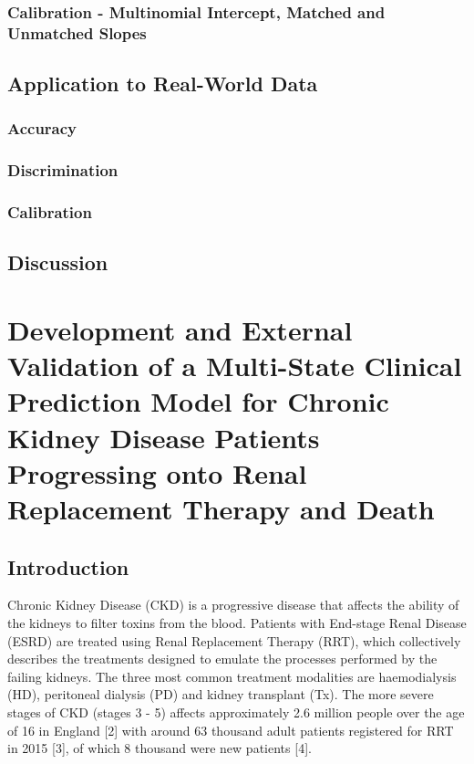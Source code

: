 \documentclass[12pt,twoside]{reedthesis}
\begin{document}
\hypertarget{calibration---multinomial-intercept-matched-and-unmatched-slopes}{%
\subsection{Calibration - Multinomial Intercept, Matched and Unmatched Slopes}\label{calibration---multinomial-intercept-matched-and-unmatched-slopes}}

\hypertarget{application-to-real-world-data}{%
\section{Application to Real-World Data}\label{application-to-real-world-data}}

\hypertarget{accuracy}{%
\subsection{Accuracy}\label{accuracy}}

\hypertarget{discrimination}{%
\subsection{Discrimination}\label{discrimination}}

\hypertarget{calibration}{%
\subsection{Calibration}\label{calibration}}

\hypertarget{discussion-1}{%
\section{Discussion}\label{discussion-1}}

\hypertarget{chap-dev-paper}{%
\chapter{Development and External Validation of a Multi-State Clinical Prediction Model for Chronic Kidney Disease Patients Progressing onto Renal Replacement Therapy and Death}\label{chap-dev-paper}}

\hypertarget{introduction-4}{%
\section{Introduction}\label{introduction-4}}

Chronic Kidney Disease (CKD) is a progressive disease that affects the ability of the kidneys to filter toxins from the blood. Patients with End-stage Renal Disease (ESRD) are treated using Renal Replacement Therapy (RRT), which collectively describes the treatments designed to emulate the processes performed by the failing kidneys. The three most common treatment modalities are haemodialysis (HD), peritoneal dialysis (PD) and kidney transplant (Tx). The more severe stages of CKD (stages 3 - 5) affects approximately 2.6 million people over the age of 16 in England {[}2{]} with around 63 thousand adult patients registered for RRT in 2015 {[}3{]}, of which 8 thousand were new patients {[}4{]}.
\end{document}
